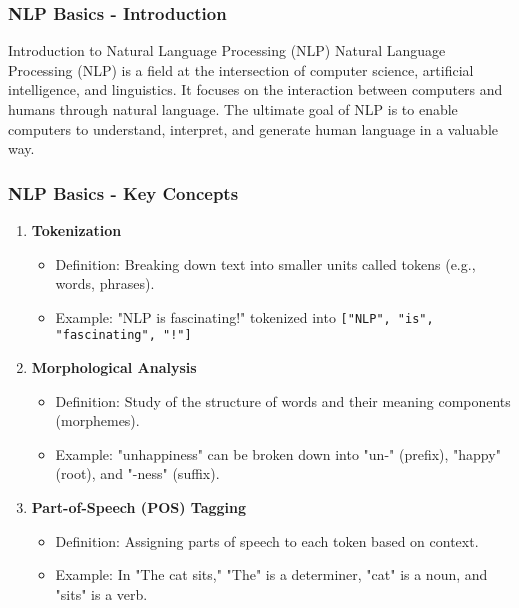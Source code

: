 \documentclass[aspectratio=169]{beamer}
\begin{document}
\begin{frame}[fragile]
    \frametitle{NLP Basics - Introduction}
    \begin{block}{Introduction to Natural Language Processing (NLP)}
        Natural Language Processing (NLP) is a field at the intersection of computer science, artificial intelligence, and linguistics. 
        It focuses on the interaction between computers and humans through natural language.
        The ultimate goal of NLP is to enable computers to understand, interpret, and generate human language in a valuable way.
    \end{block}
\end{frame}

\begin{frame}[fragile]
    \frametitle{NLP Basics - Key Concepts}
    \begin{enumerate}
        \item \textbf{Tokenization}
        \begin{itemize}
            \item Definition: Breaking down text into smaller units called tokens (e.g., words, phrases).
            \item Example: "NLP is fascinating!" tokenized into \texttt{["NLP", "is", "fascinating", "!"]}
        \end{itemize}

        \item \textbf{Morphological Analysis}
        \begin{itemize}
            \item Definition: Study of the structure of words and their meaning components (morphemes).
            \item Example: "unhappiness" can be broken down into "un-" (prefix), "happy" (root), and "-ness" (suffix).
        \end{itemize}

        \item \textbf{Part-of-Speech (POS) Tagging}
        \begin{itemize}
            \item Definition: Assigning parts of speech to each token based on context.
            \item Example: In "The cat sits," "The" is a determiner, "cat" is a noun, and "sits" is a verb.
        \end{itemize}
    \end{enumerate}
\end{frame}
\end{document}
